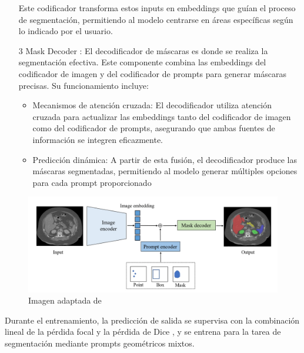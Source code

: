 \documentclass[12pt]{article}
\begin{document}
\begin{itemize}
			Este codificador transforma estos inputs en embeddings que guían el proceso de segmentación, permitiendo al modelo centrarse en áreas específicas según lo indicado por el usuario.
			
			\item[3] Mask Decoder : El decodificador de máscaras es donde se realiza la segmentación efectiva. Este componente combina las embeddings del codificador de imagen y del codificador de prompts para generar máscaras precisas. Su funcionamiento incluye:
			\begin{itemize}
				\item Mecanismos de atención cruzada: El decodificador utiliza atención cruzada para actualizar las embeddings tanto del codificador de imagen como del codificador de prompts, asegurando que ambas fuentes de información se integren eficazmente.
				\item Predicción dinámica: A partir de esta fusión, el decodificador produce las máscaras segmentadas, permitiendo al modelo generar múltiples opciones para cada prompt proporcionado
			\end{itemize}
			
		\end{itemize}
		
			\begin{figure}[h] 
				\centering
				\caption{ Imagen adaptada de \cite{Zhang2024SegmentAnything}}
				\includegraphics[width=1\textwidth]{1.jpeg}
				
				\label{fig:fig1}
				
				
			\end{figure}
		
		Durante el entrenamiento, la predicción de salida se supervisa con la combinación lineal de la pérdida focal \parencite{Lin2017FocalLF} y la pérdida de Dice \parencite{Milletari2016VNet} , y se entrena para la tarea de segmentación mediante prompts geométricos mixtos.
		\\
		
	
		
\end{document}
